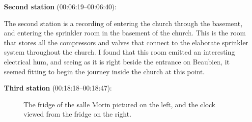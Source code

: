 \documentclass[12pt,twoside,maitrise]{dms_ks}
\theoremstyle{definition}
\begin{document}
{%

\textbf{Second station} (00:06:19--00:06:40):


The second station is a recording of entering the church through the basement, and entering the sprinkler room in the basement of the church. 
This is the room that stores all the compressors and valves that connect to the elaborate sprinkler system throughout the church. 
I found that this room emitted an interesting electrical hum, and seeing as it is right beside the entrance on Beaubien, it seemed fitting to begin the journey inside the church at this point.

\textbf{Third station} (00:18:18--00:18:47):

\begin{figure}[h]
    \centering
    \caption{The fridge of the salle Morin pictured on the left, and the clock viewed from the fridge on the right.}
    \label{fig:sidebyside}
\end{figure}

}
\end{document}

